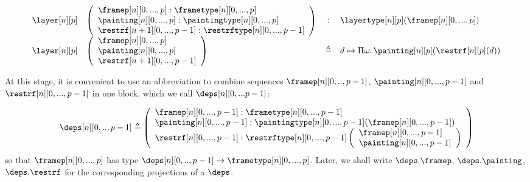 \documentclass{msc}
\newcommand{\defeq}{\ensuremath{\triangleq}}
\begin{document}
\begin{equation*}
\begin{array}{llcl}
    \layer[n][p]                                                                  &
    \left(\begin{array}{l}
              \framep[n][0,...,p]:\frametype[n][0,...,p]        \\
              \painting[n][0,...,p]:\paintingtype[n][0,...,p]   \\
              \restrf[n+1][0,...,p-1]:\restrftype[n][0,...,p-1] \\
            \end{array}\right)                          & :                                            & \layertype[n][p](\framep[n][0,...,p])                                                            \\
    \layer[n][p]                                                                  &
    \left(\begin{array}{l}
              \framep[n][0,...,p]     \\
              \painting[n][0,...,p]   \\
              \restrf[n+1][0,...,p-1] \\
            \end{array}\right)                                                    & \defeq                                       &
    d \mapsto \Pi\omega.\,\painting[n][p](\restrf[n][p](d))
  \end{array}
\end{equation*}

At this stage, it is convenient to use an abbreviation to combine sequences $\framep[n][0,..,p-1]$, $\painting[n][0,...,p-1]$ and $\restrf[n][0,...,p-1]$ in one block, which we call $\deps[n][0,...p-1]$:

\begin{align*}
  \deps[n][0,..,p-1] \defeq
  \left(\begin{array}{l}
            \framep[n][0,...,p-1] :\frametype[n][0,...,p-1] \\
            \painting[n][0,...,p-1] :\paintingtype[n][0,...,p-1]
            (\framep[n][0,...,p-1])                         \\
            \restrf[n][0,...,p-1]  :\restrftype[n][0,...,p-1]
            \left(\begin{array}{l}
                \framep[n][0,...,p-1]   \\
                \painting[n][0,...,p-1] \\
              \end{array}\right)                   \\
          \end{array}\right)
\end{align*}
so that $\framep[n][0,...,p]$ has type $\deps[n][0,..,p-1] \rightarrow \frametype[n][0,...,p]$. Later, we shall write $\deps.\framep$, $\deps.\painting$, $\deps.\restrf$ for the corresponding projections of a $\deps$.
\end{document}
